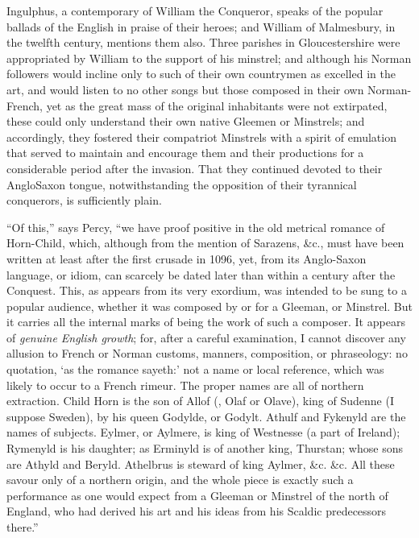 Ingulphus, a contemporary of William the Conqueror, speaks of the popular
ballads of the English in praise of their heroes; and William of Malmesbury,
in the twelfth century, mentions them also. Three parishes in Gloucestershire
were appropriated by William to the support of his minstrel; and although his
Norman followers would incline only to such of their own countrymen as excelled
in the art, and would listen to no other songs but those composed in their own
Norman-French, yet as the great mass of the original inhabitants were not extirpated,
these could only understand their own native Gleemen or Minstrels; and
accordingly, they fostered their compatriot Minstrels with a spirit of emulation
that served to maintain and encourage them and their productions for a considerable
period after the invasion. That they continued devoted to their AngloSaxon
tongue, %
notwithstanding the opposition of their tyrannical conquerors, is
sufficiently plain.

“Of this,” says Percy, “we have proof positive in the old metrical romance
of Horn-Child, which, although from the mention of Sarazens, \&c., must have
been written at least after the first crusade in 1096, yet, from its Anglo-Saxon
language, or idiom, can scarcely be dated later than within a century after the
Conquest. This, as appears from its very exordium, was intended to be sung to a
popular audience, whether it was composed by or for a Gleeman, or Minstrel. But
it carries all the internal marks of being the work of such a composer. It appears
of \textit{genuine English growth}; for, after a careful examination, I cannot discover any
allusion to French or Norman customs, manners, composition, or phraseology: no
quotation, ‘as the romance sayeth:’ not a name or local reference, which was
likely to occur to a French rimeur. The proper names are all of northern
extraction. Child Horn is the son of Allof (\ie, Olaf or Olave), king of Sudenne
(I suppose Sweden), by his queen Godylde, or Godylt. Athulf and Fykenyld are
the names of subjects. Eylmer, or Aylmere, is king of Westnesse (a part of
Ireland); Rymenyld is his daughter; as Erminyld is of another king, Thurstan;
whose sons are Athyld and Beryld. Athelbrus is steward of king Aylmer, \&c. \&c.
All these savour only of a northern origin, and the whole piece is exactly such a
performance as one would expect from a Gleeman or Minstrel of the north of
England, who had derived his art and his ideas from his Scaldic predecessors
there.”

